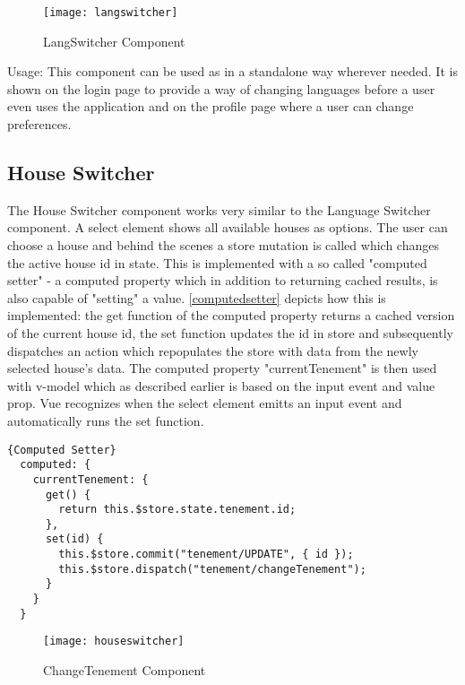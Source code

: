 \begin{figure}[H]
  \begin{center}
  \texttt{[image: langswitcher]}
  \end{center}
  \caption{LangSwitcher Component}
  \label{fig:langswitcher}
\end{figure}

Usage: This component can be used as in a standalone way wherever needed. It is shown on the login page to provide a way of changing languages before a user even uses the application and on the profile page where a user can change preferences.


\subsection{House Switcher}
The House Switcher component works very similar to the Language Switcher component. A select element shows all available houses as options. The user can choose a house and behind the scenes a store mutation is called which changes the active house id in state. This is implemented with a so called "computed setter" - a computed property which in addition to returning cached results, is also capable of "setting" a value. \autoref{computedsetter} depicts how this is implemented: the get function of the computed property returns a cached version of the current house id, the set function updates the id in store and subsequently dispatches an action which repopulates the store with data from the newly selected house's data. The computed property "currentTenement" is then used with v-model which as described earlier is based on the input event and value prop. Vue recognizes when the select element emitts an input event and automatically runs the set function. \newline 

\begin{lstlisting}[caption=Computed Setter, captionpos=b, style=htmlcssjs, label=computedsetter]{Computed Setter}
  computed: {
    currentTenement: {
      get() {
        return this.$store.state.tenement.id;
      },
      set(id) {
        this.$store.commit("tenement/UPDATE", { id });
        this.$store.dispatch("tenement/changeTenement");
      }
    }
  }
\end{lstlisting}

\begin{figure}[H]
  \begin{center}
  \texttt{[image: houseswitcher]}
  \end{center}
  \caption{ChangeTenement Component}
  \label{fig:langswitcher}
\end{figure}

